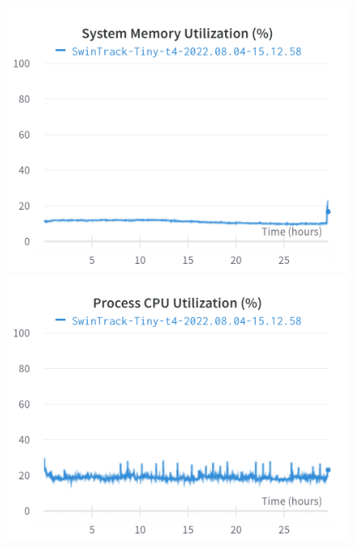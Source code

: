 \documentclass{article}
\begin{document}
\begin{figure}[h]
\includegraphics[width=\linewidth]{charts/Section-4-Panel-18-xniwp2a9l}
\caption{}
\endminipage\hfill
{}
\includegraphics[width=\linewidth]{charts/Section-4-Panel-19-gs8xd5v0j}
\caption{}
\endminipage
\end{figure}

\nocite{*}
\end{document}
